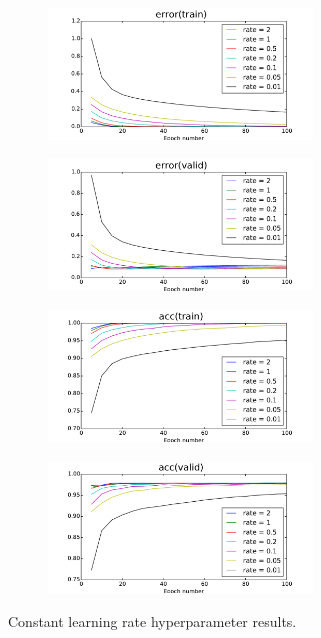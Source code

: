 \documentclass[12pt]{article}
\begin{document}
\begin{figure}[h]
\centering
\begin{subfigure}{.5\textwidth}
  \centering
  \includegraphics[width=7cm]{Task1/figures/Const_rule_error(train).pdf}
\end{subfigure}%
\begin{subfigure}{.5\textwidth}
  \centering
  \includegraphics[width=7cm]{Task1/figures/Const_rule_error(valid).pdf}
\end{subfigure}%
\end{figure}
\begin{figure}[h]
\centering
\begin{subfigure}{.5\textwidth}
  \centering
  \includegraphics[width=7cm]{Task1/figures/Const_rule_acc(train).pdf}
\end{subfigure}%
\begin{subfigure}{.5\textwidth}
  \centering
  \includegraphics[width=7cm]{Task1/figures/Const_rule_acc(valid).pdf}
\end{subfigure}%
  \caption{Constant learning rate hyperparameter results.}
  \label{fig:const}
\end{figure}
\end{document}
